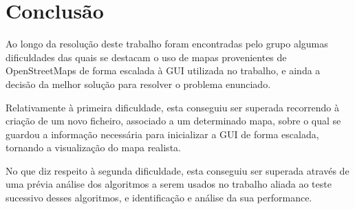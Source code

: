 \documentclass[relatorio.tex]{subfiles}
\begin{document}
\section{Conclusão}
\label{sec:conclusion}

Ao longo da resolução deste trabalho foram encontradas pelo grupo algumas dificuldades das quais se destacam o uso de mapas provenientes de OpenStreetMaps de forma escalada à GUI utilizada no trabalho, e ainda a decisão da melhor solução para resolver o problema enunciado.

Relativamente à primeira dificuldade, esta conseguiu ser superada recorrendo à criação de um novo ficheiro, associado a um determinado mapa, sobre o qual se guardou a informação necessária para inicializar a GUI de forma escalada, tornando a visualização do mapa realista.

No que diz respeito à segunda dificuldade, esta conseguiu ser superada através de uma prévia análise dos algoritmos a serem usados no trabalho aliada ao teste sucessivo desses algoritmos, e identificação e análise da sua performance.
\end{document}
